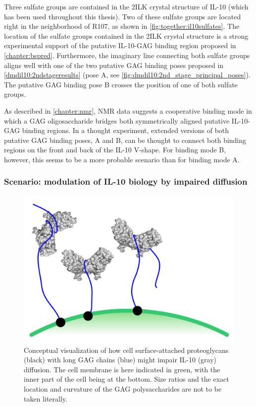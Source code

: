 Three sulfate groups are contained in the 2ILK crystal structure of IL-10 (which
has been used throughout this thesis). Two of these sulfate groups are located
right in the neighborhood of R107, as shown in \cref{fig:together:il10sulfates}.
The location of the sulfate groups contained in the 2ILK crystal structure is a
strong experimental support of the putative IL-10-GAG binding region proposed in
\cref{chapter:bspred}. Furthermore, the imaginary line connecting both sulfate
groups aligns well with one of the two putative GAG binding poses proposed in
\cref{dmdil10:2ndstageresults} (pose A, see
\cref{fig:dmdil10:2nd_stage_principal_poses}). The putative GAG binding pose B
crosses the position of one of both sulfate groups.

As described in \cref{chapter:nmr}, NMR data suggests a cooperative binding mode
in which a GAG oligosaccharide bridges both symmetrically aligned putative
IL-10-GAG binding regions. In a thought experiment, extended versions of both
putative GAG binding poses, A and B, can be thought to connect both binding
regions on the front and back of the IL-10 V-shape. For binding mode B, however,
this seems to be a more probable scenario than for binding mode A.


\subsubsection{Scenario: modulation of IL-10 biology by impaired diffusion}

\begin{figure}
\centering
\includegraphics[width=1.0\textwidth]{gfx/together/agglomeration_small.jpg}
\caption[]{
Conceptual visualization of how cell surface-attached proteoglycans (black) with
long GAG chains (blue) might impair IL-10 (gray) diffusion. The cell membrane is
here indicated in green, with the inner part of the cell being at the bottom.
Size ratios and the exact location and curvature of the GAG polysaccharides are
not to be taken literally.}
\label{fig:together:diffusionimpaired}
\end{figure}

